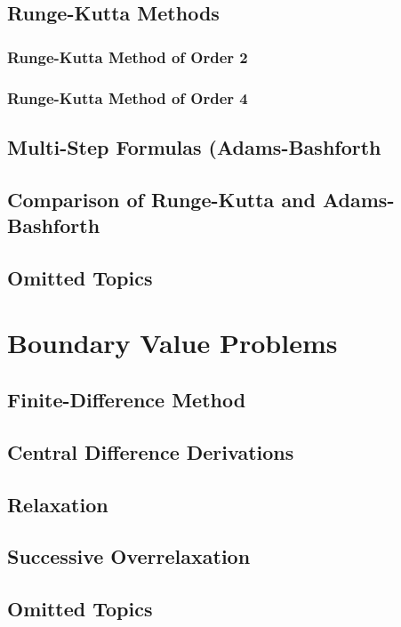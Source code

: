 \subsection{Runge-Kutta Methods}

\subsubsection{Runge-Kutta Method of Order 2}

\subsubsection{Runge-Kutta Method of Order 4}

\subsection{Multi-Step Formulas (Adams-Bashforth}

\subsection{Comparison of Runge-Kutta and Adams-Bashforth}

\subsection{Omitted Topics}

\section{Boundary Value Problems}

\subsection{Finite-Difference Method}

\subsection{Central Difference Derivations}

\subsection{Relaxation}

\subsection{Successive Overrelaxation}

\subsection{Omitted Topics}